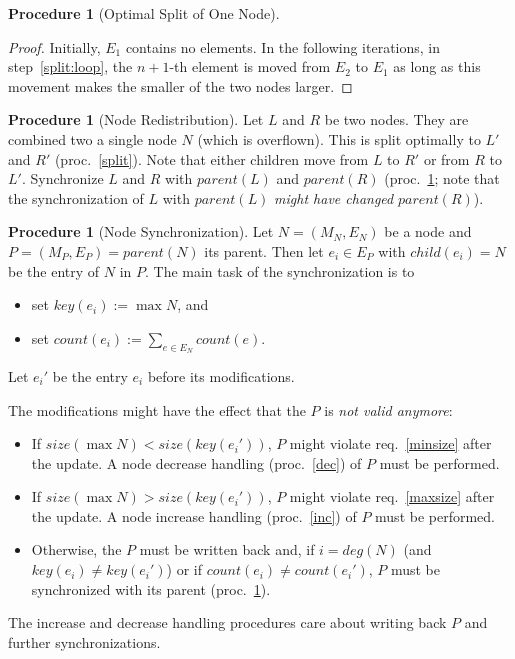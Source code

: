 \documentclass[a4paper, 8pt, twoclumn]{scrartcl}
\theoremstyle{plain}
\theoremstyle{definition}
\newtheorem{proc}[thm]{Procedure}
\theoremstyle{remark}
\begin{document}
\begin{multicols}{2}
\begin{proc}[Optimal Split of One Node]
\begin{proof}
Initially, $E_1$ contains no elements.
In the following iterations, in step~\ref{split:loop}, the $n + 1$-th element
is moved from $E_2$ to $E_1$ as long as this movement makes the smaller 
of the two nodes larger.
\end{proof}
\end{proc}


\begin{proc}[Node Redistribution] \label{dist}
Let $L$ and $R$ be two nodes. They are combined two a single node $N$
(which is overflown).
This is split optimally to $L'$ and $R'$ (proc.~\ref{split}).
Note that either children move from $L$ to $R'$ or from $R$ to $L'$.
Synchronize $L$ and $R$ with $parent(L)$ and $parent(R)$ (proc.~\ref{sync};
note that the synchronization of $L$ with $parent(L)$ {\em might have changed}
$parent(R)$).
\end{proc}


\begin{proc}[Node Synchronization] \label{sync}
Let \mbox{$N = (M_N, E_N)$} be a node and \mbox{$P = (M_P, E_P)  = parent(N)$}
its parent.
Then let \mbox{$e_i \in E_P$} with \mbox{$child(e_i) = N$} be the entry of
$N$ in $P$.
The main task of the synchronization is to
\begin{itemize}
\item set \mbox{$key(e_i) := \max N$}, and
\item set \mbox{$count(e_i) := \sum_{e \in E_N} count(e)$}.
\end{itemize}
Let $e_i'$ be the entry $e_i$ before its modifications.

The modifications might have the effect that the $P$ is {\em not valid anymore}:
\begin{itemize}
\item If \mbox{$size(\max N) < size(key(e_i'))$},
	$P$ might violate req.~\ref{minsize} after the update.
	A node decrease handling (proc.~\ref{dec}) of $P$ must be performed.
\item If \mbox{$size(\max N) > size(key(e_i'))$},
	$P$ might violate req.~\ref{maxsize} after the update.
	A node increase handling (proc.~\ref{inc}) of $P$ must be performed.
\item Otherwise, the $P$ must be written back and, if $i = deg(N)$ (and
	$key(e_i) \neq key(e_i')$) or if $count(e_i) \neq count(e_i')$, $P$
	must be synchronized with its parent (proc.~\ref{sync}).
\end{itemize}

The increase and decrease handling procedures care about writing back $P$
and further synchronizations.


\end{proc}
\end{multicols}
\end{document}
